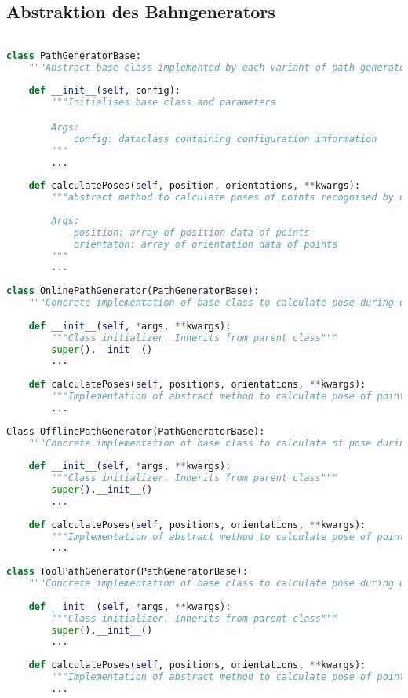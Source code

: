 \subsection{Abstraktion des Bahngenerators}
\begin{lstlisting}[language=Python, columns=fullflexible, frame=single, breaklines=true, postbreak=\mbox{\textcolor{red}{$\hookrightarrow$}\space}]

class PathGeneratorBase:
	"""Abstract base class implemented by each variant of path generator"""
	
	def __init__(self, config):
		"""Initialises base class and parameters

		Args:
			config: dataclass containing configuration information
		"""
		...
	
	def calculatePoses(self, position, orientations, **kwargs):
		"""abstract method to calculate poses of points recognised by detectors
		
		Args:
			position: array of position data of points
			orientaton: array of orientation data of points
		"""
		...
		
class OnlinePathGenerator(PathGeneratorBase):
	"""Concrete implementation of base class to calculate pose during online path following"""
	
	def __init__(self, *args, **kwargs):
		"""Class initializer. Inherits from parent class"""
		super().__init__()
		...
		
	def calculatePoses(self, positions, orientations, **kwargs):
		"""Implementation of abstract method to calculate pose of points detected during online path following"""
		...
		
Class OfflinePathGenerator(PathGeneratorBase):
	"""Concrete implementation of base class to calculate of pose during offline path following"""
	
	def __init__(self, *args, **kwargs):
		"""Class initializer. Inherits from parent class"""
		super().__init__()
		...
		
	def calculatePoses(self, positions, orientations, **kwargs):
		"""Implementation of abstract method to calculate pose of points after weld seam detection in offline path following"""
		...
		
class ToolPathGenerator(PathGeneratorBase):
	"""Concrete implementation of base class to calculate pose during offline tool path following"""
	
	def __init__(self, *args, **kwargs):
		"""Class initializer. Inherits from parent class"""
		super().__init__()
		...
		
	def calculatePoses(self, positions, orientations, **kwargs):
		"""Implementation of abstract method to calculate pose of points detected in tool path following"""
		...

\end{lstlisting}
